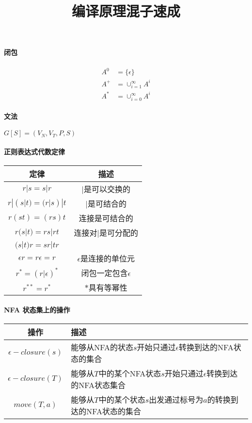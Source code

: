 \documentclass[10pt]{article}
\title{编译原理混子速成}
\date{}
\begin{document}
	\begin{multicols}{3}
		\maketitle
		\paragraph{闭包}
		\begin{align*}
			A^0 &=\{\epsilon\} \\
			A^+ &= \cup_{i=1}^\infty A^i\\
			A^* &= \cup_{i=0}^\infty A^i
		\end{align*}
		\paragraph{文法} $ G[S]=(V_N, V_T, P, S) $
		\paragraph{正则表达式代数定律}\hfill
		
			\noindent\begin{tabular}{|c|c|}
				\hline
				定律 & 描述 \\
				\hline
				$r|s=s|r$ & $|$是可以交换的 \\
				\hline
				$r|(s|t)=(r|s)|t$ & $|$是可结合的 \\
				\hline
				$r(st)=(rs)t$ & 连接是可结合的 \\
				\hline
				$r(s|t)=rs|rt$ & 连接对$|$是可分配的 \\
				$(s|t)r=sr|tr$ & \\
				\hline
				$\epsilon r = r\epsilon = r$& $\epsilon$是连接的单位元 \\
				\hline
				$r^*=(r|\epsilon)^*$& 闭包一定包含$\epsilon$ \\
				\hline
				$r^{**}=r^*$ & $*$具有等幂性 \\
				\hline
			\end{tabular}
		
		\paragraph{NFA 状态集上的操作}\hfill
		
		\noindent\begin{tabular}{|c|p{9em}|}
			\hline
			操作 & 描述 \\
			\hline
			$ \epsilon-closure(s) $ & 能够从NFA的状态$ s $开始只通过$\epsilon$转换到达的NFA状态的集合 \\
			\hline
			$ \epsilon-closure(T) $& 能够从$ T $中的某个NFA状态$ s $开始只通过$\epsilon$转换到达的NFA状态集合 \\
			\hline
			$ move(T,a) $& 能够从$ T $中的某个状态$ s $出发通过标号为$ a $的转换到达的NFA状态的集合 \\
			\hline
		\end{tabular}
		

\end{multicols}
\end{document}

